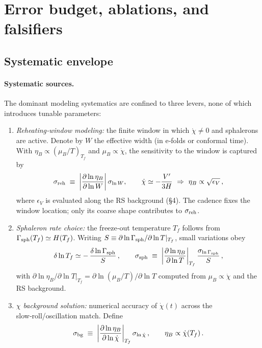 \documentclass[11pt]{article}
\begin{document}
\section{Error budget, ablations, and falsifiers}

\subsection{Systematic envelope}

\paragraph{Systematic sources.}
The dominant modeling systematics are confined to three levers, none of which introduces tunable parameters:
\begin{enumerate}
  \item \emph{Reheating‑window modeling:} the finite window in which \(\dot\chi\neq 0\) and sphalerons are active. Denote by \(W\) the effective width (in e‑folds or conformal time). With \(\eta_B \propto (\mu_B/T)_{T_f}\) and \(\mu_B\propto \dot\chi\), the sensitivity to the window is captured by
  \begin{equation}
    \sigma_{\rm reh}
    \;\equiv\;
    \bigg|\frac{\partial \ln \eta_B}{\partial \ln W}\bigg|\,\sigma_{\ln W},
    \qquad
    \dot\chi \simeq -\frac{V'}{3H}\ \Rightarrow\ \eta_B \propto \sqrt{\epsilon_V}\,,
  \end{equation}
  where \(\epsilon_V\) is evaluated along the RS background (\S4). The cadence fixes the window location; only its coarse shape contributes to \(\sigma_{\rm reh}\).
  \item \emph{Sphaleron rate choice:} the freeze‑out temperature \(T_f\) follows from \(\Gamma_{\rm sph}(T_f)\simeq H(T_f)\). Writing \(S\equiv \partial \ln\Gamma_{\rm sph}/\partial \ln T|_{T_f}\), small variations obey
  \begin{equation}
    \delta \ln T_f \simeq -\,\frac{\delta \ln \Gamma_{\rm sph}}{S}\,,
    \qquad
    \sigma_{\rm sph}
    \;\equiv\;
    \bigg|\frac{\partial \ln \eta_B}{\partial \ln T}\bigg|_{T_f}\,\frac{\sigma_{\ln \Gamma_{\rm sph}}}{S}\,,
  \end{equation}
  with \(\partial \ln \eta_B/\partial \ln T|_{T_f}=\partial \ln (\mu_B/T)/\partial \ln T\) computed from \(\mu_B\propto \dot\chi\) and the RS background. 
  \item \emph{\(\chi\) background solution:} numerical accuracy of \(\dot\chi(t)\) across the slow‑roll/oscillation match. Define 
  \begin{equation}
    \sigma_{\rm bg}
    \;\equiv\;
    \bigg|\frac{\partial \ln \eta_B}{\partial \ln \dot\chi}\bigg|_{T_f}\,\sigma_{\ln \dot\chi}\,,
    \qquad
    \eta_B \propto \dot\chi(T_f)\,.
  \end{equation}
\end{enumerate}
\end{document}
